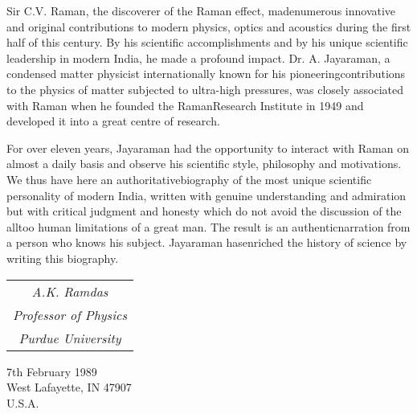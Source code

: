 Sir C.V\@. Raman, the discoverer of the Raman effect, made\break numerous innovative and original contributions to modern physics, optics and acoustics during the first half of this century. By his scientific accomplishments and by his unique scientific leadership in modern India, he made a profound impact. Dr\@. A\@. Jayaraman, a condensed matter physicist internationally known for his pioneering\break contributions to the physics of matter subjected to ultra-high pressures, was closely associated with Raman when he founded the Raman\break Research Institute in 1949 and developed it into a great centre of research.

For over eleven years, Jayaraman had the opportunity to interact with Raman on almost a daily basis and observe his scientific style, philosophy and motivations. We thus have here an authoritative\break biography of the most unique scientific personality of modern India, written with genuine understanding and admiration but with critical judgment and honesty which do not avoid the discussion of the all\break too human limitations of a great man.  The result is an authentic\break narration from a person who knows his subject. Jayaraman has\break enriched the history of science by writing this biography.

 
\bigskip
\bigskip
\begin{flushright}
\begin{tabular}{c@{}}
{\em A.K. Ramdas}\\
{\em Professor of Physics}\\
{\em Purdue University}
\end{tabular}
\end{flushright}

\bigskip

\noindent
7th February 1989\\
West Lafayette, IN 47907\\
U.S.A.
